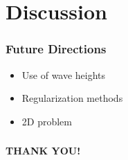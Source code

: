 \documentclass[7pt]{beamer}
\begin{document}
\section{Discussion}
\begin{frame}
 \frametitle{Future Directions }
 \begin{itemize}
 \item Use of wave heights
 \item Regularization methods
 \item 2D problem
 \end{itemize}

\end{frame}
\begin{frame}
\frametitle{}
\hspace{2.5cm}
\begin{minipage}{50mm}   
                                                                                                                           
      \begin{alertblock}{}    
                                          
            \begin{center}
                                                                                                                                                                                  
                  \textbf{THANK YOU!}
                            
                                                                       
            \end{center}
      \end{alertblock}
\end{minipage}
\end{frame}

\end{document}
